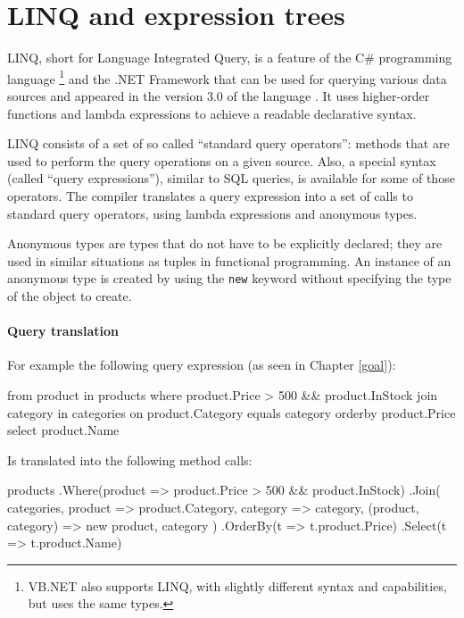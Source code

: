 \section{LINQ and expression trees}
\label{linq}

\acs{LINQ}, short for Language Integrated Query, is a feature of the C\# programming language%
\footnote{\ac{VB.NET} also supports \ac{LINQ}, with slightly different syntax
and capabilities, but uses the same types.}
and the .NET Framework that can be used for querying various data sources
and appeared in the version 3.0 of the language \cite{cs-in-depth}.
It uses higher-order functions and lambda expressions to achieve a readable declarative syntax.

\ac{LINQ} consists of a set of so called “standard query operators”:
methods that are used to perform the query operations on a given source.
Also, a special syntax (called “query expressions”), similar to \ac{SQL} queries, is available
for some of those operators.
The compiler translates a query expression into a set of calls to standard query operators,
using lambda expressions and anonymous types.

Anonymous types are types that do not have to be explicitly declared;
they are used in similar situations as tuples in functional programming.
An instance of an anonymous type is created by using the \lstinline{new} keyword
without specifying the type of the object to create.

\paragraph{Query translation}

For example the following query expression (as seen in Chapter \ref{goal}):

\nopagebreak

\begin{code}
from product in products
where product.Price > 500
   && product.InStock
join category in categories on product.Category equals category
orderby product.Price
select product.Name
\end{code}

Is translated into the following method calls:

\begin{code}
products
    .Where(product => product.Price > 500 && product.InStock)
    .Join(
        categories,
        product => product.Category,
        category => category,
        (product, category) => new { product, category })
    .OrderBy(t => t.product.Price)
    .Select(t => t.product.Name)
\end{code}

